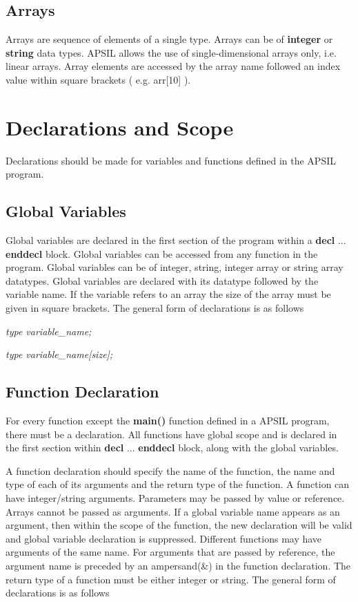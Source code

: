 \subsection{Arrays}
Arrays are  sequence of elements of a single type. Arrays can be of \textbf{integer} or \textbf{string} data types.
APSIL allows the use of single-dimensional arrays only, i.e. linear arrays. Array elements are accessed by the array name followed an index value within square brackets ( e.g. arr[10] ).


\section{Declarations and Scope}

Declarations should be made for  variables and functions defined in the APSIL program.




\subsection{Global Variables}
Global variables are declared in the first section of the program within a \textbf{decl} ... \textbf{enddecl} block. Global variables can be accessed from any function in the program. Global variables can be of integer, string, integer array or string array datatypes. Global variables are declared with its datatype followed by the variable name. If the variable refers to an array the size of the array must be given in square brackets. The general form of declarations is as follows 

\textit{type variable\_name;} 

\textit{type variable\_name[size];}





\subsection{Function Declaration}
For every function except the \textbf{main()} function defined in a APSIL program, there must be a declaration. All functions have global scope and is declared in the first section within  \textbf{decl} ... \textbf{enddecl} block, along with the global variables.

A function declaration should specify the name of the function, the name and type of each of its arguments and the return type of the function. A function can have integer/string arguments. Parameters may be passed by value or reference. Arrays cannot be passed as arguments. If a global variable name appears as an argument, then within the scope of the function, the new declaration will be valid and global variable declaration is suppressed. Different functions may have arguments of the same name. For arguments that are passed by reference, the argument name is preceded by an ampersand(\&) in the function declaration. The return type of a function must be either integer or string. The general form of declarations is as follows \\ 

